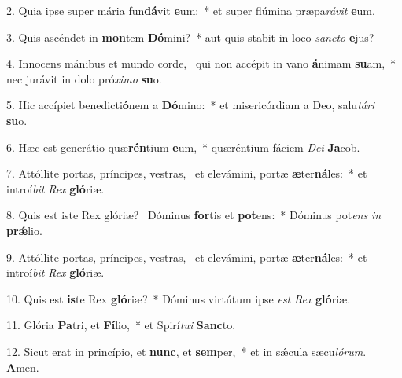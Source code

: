 2. Quia ipse super mária fun\textbf{dá}vit \textbf{e}um:~*  et super flúmina præpa\textit{rá}\textit{vit} \textbf{e}um.\

3. Quis ascéndet in \textbf{mon}tem \textbf{Dó}mini?~*  aut quis stabit in loco \textit{sanc}\textit{to} \textbf{e}jus?\

4. Innocens mánibus et mundo corde, \dag\  qui non accépit in vano \textbf{á}nimam \textbf{su}am,~*  nec jurávit in dolo pró\textit{xi}\textit{mo} \textbf{su}o.\

5. Hic accípiet benedicti\textbf{ó}nem a \textbf{Dó}mino:~*  et misericórdiam a Deo, salu\textit{tá}\textit{ri} \textbf{su}o.\

6. Hæc est generátio quæ\textbf{rén}tium \textbf{e}um,~*  quæréntium fáciem \textit{De}\textit{i} \textbf{Ja}cob.\

7. Attóllite portas, príncipes, vestras, \dag\  et elevámini, portæ \textbf{æ}ter\textbf{ná}les:~*  et introí\textit{bit} \textit{Rex} \textbf{gló}riæ.\

8. Quis est iste Rex glóriæ? \dag\  Dóminus \textbf{for}tis et \textbf{pot}ens:~*  Dóminus pot\textit{ens} \textit{in} \textbf{prǽ}lio.\

9. Attóllite portas, príncipes, vestras, \dag\  et elevámini, portæ \textbf{æ}ter\textbf{ná}les:~*  et introí\textit{bit} \textit{Rex} \textbf{gló}riæ.\

10. Quis est \textbf{is}te Rex \textbf{gló}riæ?~*  Dóminus virtútum ipse \textit{est} \textit{Rex} \textbf{gló}riæ.\

11. Glória \textbf{Pa}tri, et \textbf{Fí}lio,~*  et Spirí\textit{tu}\textit{i} \textbf{Sanc}to.\

12. Sicut erat in princípio, et \textbf{nunc}, et \textbf{sem}per,~*  et in sǽcula sæcu\textit{ló}\textit{rum}. \textbf{A}men.\

